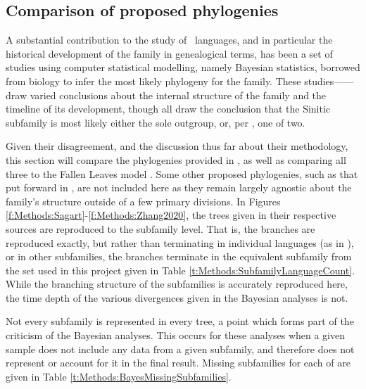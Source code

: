 \subsection{Comparison of proposed phylogenies}\label{ss:Methods:Bayesian}

A substantial contribution to the study of \lfam\ languages, and in particular the historical development of the family in genealogical terms, has been a set of studies using computer statistical modelling, namely Bayesian statistics, borrowed from biology to infer the most likely phylogeny for the family. These studies------draw varied conclusions about the internal structure of the family and the timeline of its development, though all draw the conclusion that the Sinitic subfamily is most likely either the sole outgroup, or, per , one of two.

Given their disagreement, and the discussion thus far about their methodology, this section will compare the phylogenies provided in , as well as comparing all three to the Fallen Leaves model \cite{VanDriem2014}. Some other proposed phylogenies, such as that put forward in , are not included here as they remain largely agnostic about the family's structure outside of a few primary divisions. In Figures \ref{f:Methods:Sagart}-\ref{f:Methods:Zhang2020}, the trees given in their respective sources are reproduced to the subfamily level. That is, the branches are reproduced exactly, but rather than terminating in individual languages (as in ), or in other subfamilies, the branches terminate in the equivalent subfamily from the set used in this project given in Table \ref{t:Methods:SubfamilyLanguageCount}. While the branching structure of the subfamilies is accurately reproduced here, the time depth of the various divergences given in the Bayesian analyses is not.

Not every subfamily is represented in every tree, a point which forms part of the criticism of the Bayesian analyses. This occurs for these analyses when a given sample does not include any data from a given subfamily, and therefore does not represent or account for it in the final result. Missing subfamilies for each of  are given in Table \ref{t:Methods:BayesMissingSubfamilies}.

